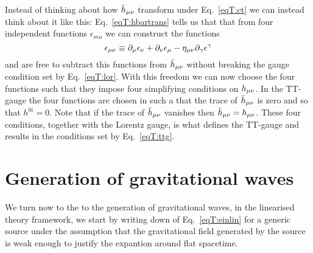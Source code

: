 Instead of thinking about how $\bar{h}_{\mu\nu}$ transform under Eq.~\ref{eqT:ct}
we can instead think about it like this: Eq.~\ref{eqT:hbartrans} tells us that
that from four independent functions $\epsilon_{mu}$ we can construct the functions 
\begin{equation}
\epsilon_{\mu\nu} \equiv \partial_{\mu} \epsilon_{\nu} + \partial_{\nu} \epsilon_{\mu} - \eta_{\mu\nu}\partial_{\gamma} \epsilon^{\gamma}
\end{equation}
and are free to subtract this functions from $\bar{h}_{\mu\nu}$ without breaking the gauge condition set by Eq.~\ref{eqT:lor}.
With this freedom we can now choose the four functions such that they impose four simplifying conditions on  $h_{\mu\nu}$.
In the TT-gauge the four functions are chosen in such a that the trace of $\bar{h}_{\mu\nu}$ is zero and
so that $h^{0i} = 0$. Note that if the trace of $\bar{h}_{\mu\nu}$ vanishes then $\bar{h}_{\mu\nu} = h_{\mu\nu}$.
These four conditions, together with the Lorentz gauge, is what defines the TT-gauge and results in the
conditions set by Eq.~\ref{eqT:ttg}.

\section{Generation of gravitational waves}
We turn now to the to the generation of gravitational waves, in the linearised theory framework,
we start by writing down of Eq.~\ref{eqT:einlin} for a generic source under the assumption 
that the gravitational field generated by the source is weak enough to justify the expantion
around flat spacetime. 


